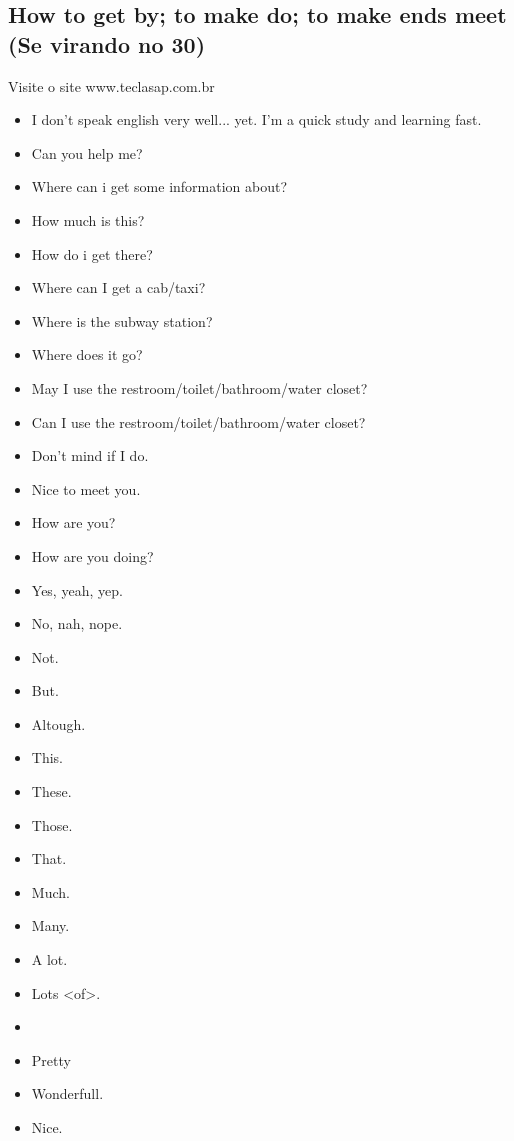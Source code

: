 \documentclass[12pt,a4paper]{article} %
\begin{document}
\subsection{How to get by; to make do; to make ends meet (Se virando no 30)}
Visite o site www.teclasap.com.br\\
\begin{itemize}
\item I don't speak english very well... yet. I'm a quick study and learning fast.
\item Can you help me?
\item Where can i get some information about?
\item How much is this?
\item How do i get there?
\item Where can I get a cab/taxi?
\item Where is the subway station?
\item Where does it go?
\item May I use the restroom/toilet/bathroom/water closet?
\item Can I use the restroom/toilet/bathroom/water closet?
\item Don't mind if I do.
\item Nice to meet you.
\item How are you?
\item How are you doing?
\item Yes, yeah, yep.
\item No, nah, nope.
\item Not.
\item But.
\item Altough.
\item This.
\item These.
\item Those.
\item That.
\item Much.
\item Many.
\item A lot.
\item Lots <of>.
\item 
\item Pretty
\item Wonderfull.
\item Nice.
\end{itemize}
\end{document}

